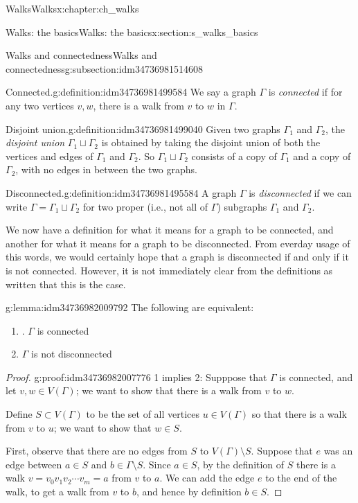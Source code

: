 \documentclass[oneside,10pt,]{book}
\numberwithin{equation}{section}
\begin{document}
\begin{chapterptx}{Walks}{}{Walks}{}{}{x:chapter:ch_walks}
\begin{sectionptx}{Walks: the basics}{}{Walks: the basics}{}{}{x:section:s_walks_basics}
\begin{subsectionptx}{Walks and connectedness}{}{Walks and connectedness}{}{}{g:subsection:idm34736981514608}
\begin{definition}{Connected.}{g:definition:idm34736981499584}%
We say a graph \(\Gamma\) is \emph{connected} if for any two vertices \(v,w\), there is a walk from \(v\) to \(w\) in \(\Gamma\).%
\end{definition}
\begin{definition}{Disjoint union.}{g:definition:idm34736981499040}%
Given two graphs \(\Gamma_1\) and \(\Gamma_2\), the \emph{disjoint union} \(\Gamma_1\sqcup \Gamma_2\) is obtained by taking the disjoint union of both the vertices and edges of \(\Gamma_1\) and \(\Gamma_2\).  So \(\Gamma_1\sqcup\Gamma_2\) consists of a copy of \(\Gamma_1\) and a copy of \(\Gamma_2\), with no edges in between the two graphs.%
\end{definition}
\begin{definition}{Disconnected.}{g:definition:idm34736981495584}%
A graph \(\Gamma\) is \emph{disconnected} if we can write \(\Gamma=\Gamma_1\sqcup \Gamma_2\) for two proper (i.e., not all of \(\Gamma\)) subgraphs \(\Gamma_1\) and \(\Gamma_2\).%
\end{definition}
We now have a definition for what it means for a graph to be connected, and another for what it means for a graph to be disconnected.  From everday usage of this words, we would certainly hope that a graph is disconnected if and only if it is not connected.  However, it is not immediately clear from the definitions as written that this is the case.%
\begin{lemma}{}{}{g:lemma:idm34736982009792}%
The following are equivalent:%
%
\begin{enumerate}
\item{}. \(\Gamma\) is connected%
\item{}\(\Gamma\) is not disconnected%
\end{enumerate}
\end{lemma}
\begin{proof}{}{g:proof:idm34736982007776}
1 implies 2: Supppose that \(\Gamma\) is connected, and let \(v, w\in V(\Gamma)\); we want to show that there is a walk from \(v\) to \(w\).%
\par
Define \(S\subset V(\Gamma)\) to be the set of all vertices \(u\in V(\Gamma)\) so that there is a walk from \(v\) to \(u\); we want to show that \(w\in S\).%
\par
First, observe that there are no edges from \(S\) to \(V(\Gamma)\setminus S\).  Suppose that \(e\) was an edge between \(a\in S\) and \(b\in\Gamma\setminus S\).  Since \(a\in S\), by the definition of \(S\) there is a walk \(v=v_0v_1v_2\cdots v_m=a\) from \(v\) to \(a\).  We can add the edge \(e\) to the end of the walk, to get a walk from \(v\) to \(b\), and hence by definition \(b\in S\).%

\end{proof}
\end{subsectionptx}
\end{sectionptx}
\end{chapterptx}
\end{document}
